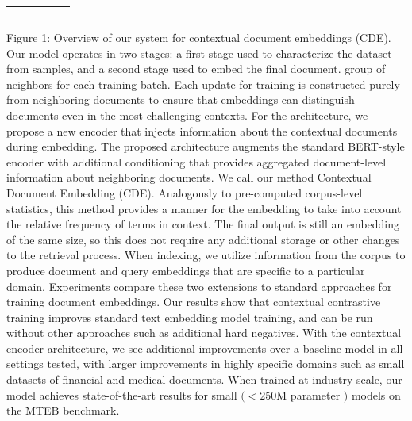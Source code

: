 \begin{tabular}
{\begin{tabular}{|c|c|c|c|c|}
\hline & & & & \\
\hline & & & & \\
\hline & & & & \\
\hline
\end{tabular}
Figure 1: Overview of our system for contextual document embeddings (CDE). Our model operates in two stages: a first stage used to characterize the dataset from samples, and a second stage used to embed the final document.
group of neighbors for each training batch. Each update for training is constructed purely from neighboring documents to ensure that embeddings can distinguish documents even in the most challenging contexts.
For the architecture, we propose a new encoder that injects information about the contextual documents during embedding. The proposed architecture augments the standard BERT-style encoder with additional conditioning that provides aggregated document-level information about neighboring documents. We call our method Contextual Document Embedding (CDE). Analogously to pre-computed corpus-level statistics, this method provides a manner for the embedding to take into account the relative frequency of terms in context. The final output is still an embedding of the same size, so this does not require any additional storage or other changes to the retrieval process. When indexing, we utilize information from the corpus to produce document and query embeddings that are specific to a particular domain.
Experiments compare these two extensions to standard approaches for training document embeddings. Our results show that contextual contrastive training improves standard text embedding model training, and can be run without other approaches such as additional hard negatives. With the contextual encoder architecture, we see additional improvements over a baseline model in all settings tested, with larger improvements in highly specific domains such as small datasets of financial and medical documents. When trained at industry-scale, our model achieves state-of-the-art results for small \((<250 \mathrm{M}\) parameter \()\) models on the MTEB benchmark.
}
\end{tabular}
